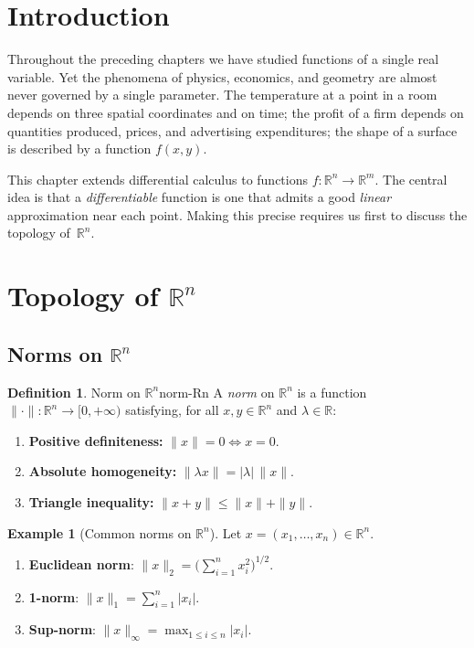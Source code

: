 \documentclass[12pt,a4paper]{book}
\theoremstyle{definition}
\newtheorem{definition}{Definition}[chapter]
\newtheorem{example}{Example}[chapter]
\begin{document}
\section*{Introduction}

Throughout the preceding chapters we have studied functions of a single real
variable.  Yet the phenomena of physics, economics, and geometry are almost
never governed by a single parameter.  The temperature at a point in a room
depends on three spatial coordinates and on time; the profit of a firm depends
on quantities produced, prices, and advertising expenditures; the shape of a
surface is described by a function $f(x,y)$.

This chapter extends differential calculus to functions
$f\colon \mathbb{R}^n \to \mathbb{R}^m$.  The central idea is that a
\emph{differentiable} function is one that admits a good \emph{linear}
approximation near each point.  Making this precise requires us first to
discuss the topology of~$\mathbb{R}^n$.

\section{Topology of \texorpdfstring{$\mathbb{R}^n$}{Rn}}
\label{sec:topology-Rn}

\subsection{Norms on \texorpdfstring{$\mathbb{R}^n$}{Rn}}
\label{subsec:norms-Rn}

\begin{definition}{Norm on $\mathbb{R}^n$}{norm-Rn}
A \emph{norm} on $\mathbb{R}^n$ is a function
$\|\cdot\|\colon \mathbb{R}^n \to [0,+\infty)$ satisfying, for all
$x,y\in\mathbb{R}^n$ and $\lambda\in\mathbb{R}$:
\begin{enumerate}[label=(\roman*)]
  \item \textbf{Positive definiteness:} $\|x\|=0 \iff x=0$.
  \item \textbf{Absolute homogeneity:} $\|\lambda x\|=|\lambda|\,\|x\|$.
  \item \textbf{Triangle inequality:} $\|x+y\|\le \|x\|+\|y\|$.
\end{enumerate}
\end{definition}

\begin{example}[Common norms on $\mathbb{R}^n$]
\label{ex:common-norms}
Let $x=(x_1,\dots,x_n)\in\mathbb{R}^n$.
\begin{enumerate}[label=(\alph*)]
  \item \textbf{Euclidean norm}:
    $\|x\|_2 = \bigl(\sum_{i=1}^n x_i^2\bigr)^{1/2}$.
  \item \textbf{1-norm}:
    $\|x\|_1 = \sum_{i=1}^n |x_i|$.
  \item \textbf{Sup-norm}:
    $\|x\|_\infty = \max_{1\le i\le n}|x_i|$.
\end{enumerate}
\end{example}
\end{document}
